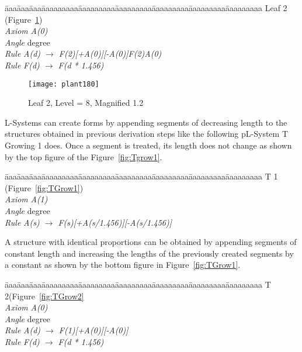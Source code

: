 \begin{tabbing}
\=aaa\=aaa\=aaa\=aaaaaaaaa\=aaaaaaaaa\=aaaaaaaaa\=aaaaaaaaa\=aaaaaaaaa\=aaaaaaaaa\kill
Leaf 2 (Figure~\ref{fig:plant180})\\
\>\>\>\> \emph{Axiom} \>\>\emph{A(0)}\\
\>\>\>\> \emph{Angle} \> degree\\
\>\>\>\> \emph{Rule}  \>\>\emph{A(d) $\rightarrow$ F(2)[+A(0)][-A(0)]F(2)A(0)}\\
\>\>\>\> \emph{Rule}  \>\>\emph{F(d) $\rightarrow$ F(d * 1.456)}
\end{tabbing}

\begin{figure}[!htbp]
\centerline{\texttt{[image: plant180]}}
\caption{Leaf 2, Level = 8, Magnified 1.2}
\label{fig:plant180}
\end{figure}



L-Systems can create forms by appending segments of decreasing length
to the structures obtained in previous derivation steps like the
following pL-System T Growing 1 does.  Once a segment is treated, its
length does not change as shown by the top figure of the
Figure~\ref{fig:Tgrow1}.

\begin{tabbing}
\=aaa\=aaa\=aaa\=aaaaaaaaa\=aaaaaaaaa\=aaaaaaaaa\=aaaaaaaaa\=aaaaaaaaa\=aaaaaaaaa\kill
T 1 (Figure~\ref{fig:TGrow1})\\
\>\>\>\> \emph{Axiom} \>\>\emph{A(1)}\\
\>\>\>\> \emph{Angle} \> degree\\
\>\>\>\> \emph{Rule}  \>\>\emph{A(s) $\rightarrow$ F(s)[+A(s/1.456)][-A(s/1.456)]}\\
\end{tabbing}

A structure with identical proportions can be obtained by appending
segments of constant length and increasing the lengths of the
previously created segments by a constant as shown by the bottom
figure in Figure~\ref{fig:TGrow1}.

\begin{tabbing}
\=aaa\=aaa\=aaa\=aaaaaaaaa\=aaaaaaaaa\=aaaaaaaaa\=aaaaaaaaa\=aaaaaaaaa\=aaaaaaaaa\kill
T 2(Figure~\ref{fig:TGrow2}\\
\>\>\>\> \emph{Axiom} \>\>\emph{A(0)}\\
\>\>\>\> \emph{Angle} \> degree\\
\>\>\>\> \emph{Rule}  \>\>\emph{A(d) $\rightarrow$ F(1)[+A(0)][-A(0)]}\\
\>\>\>\> \emph{Rule}  \>\>\emph{F(d) $\rightarrow$ F(d * 1.456)}
\end{tabbing}

